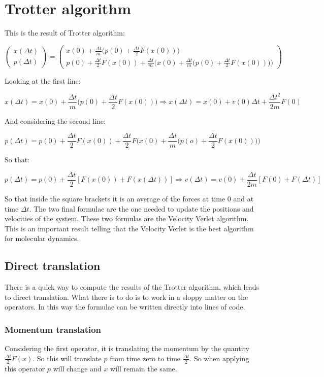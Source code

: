 \section{Trotter algorithm}
This is the result of Trotter algorithm:

$$\begin{pmatrix} x(\Delta t)\\ p(\Delta t)\end{pmatrix} =\begin{pmatrix} x(0) + \frac{\Delta t}{m}\biggl(p(0) + \frac{\Delta t}{2}F(x(0))\biggr) \\ p(0) + \frac{\Delta t}{2}F(x(0)) + \frac{\Delta t}{m}\biggl(x(0) + \frac{\Delta t}{m}\biggl(p(0) + \frac{\Delta t}{2}F(x(0))\biggr)\biggr)\end{pmatrix}$$

Looking at the first line:

$$x(\Delta t) = x(0) + \frac{\Delta t}{m}\biggl(p(0) + \frac{\Delta t}{2}F(x(0))\biggr)\Rightarrow x(\Delta t) = x(0) + v(0)\Delta t + \frac{\Delta t^2}{2m}F(0)$$

And considering the second line:

$$p(\Delta t) = p(0) + \frac{\Delta t}{2}F(x(0)) + \frac{\Delta t}{2}F\biggl(x(0) + \frac{\Delta t}{m}\biggl(p(o) + \frac{\Delta t}{2}F(x(0))\biggr)\biggr)$$

So that:

$$p(\Delta t) = p(0) + \frac{\Delta t}{2}[F(x(0)) + F(x(\Delta t))]\Rightarrow v(\Delta t) = v(0) + \frac{\Delta t}{2m}[F(0) + F(\Delta t)]$$

So that inside the square brackets it is an average of the forces at time $0$ and at time $\Delta t$.
The two final formulae are the one needed to update the positions and velocities of the system.
These two formulas are the Velocity Verlet algorithm.
This is an important result telling that the Velocity Verlet is the best algorithm for molecular dynamics.

	\subsection{Direct translation}
	There is a quick way to compute the results of the Trotter algorithm, which leads to direct translation.
	What there is to do is to work in a sloppy matter on the operators.
	In this way the formulae can be written directly into lines of code.

		\subsubsection{Momentum translation}
		Considering the first operator, it is translating the momentum by the quantity $\frac{\Delta t}{2}F(x)$.
		So this will translate $p$ from time zero to time $\frac{\Delta t}{2}$.
		So when applying this operator $p$ will change and $x$ will remain the same.

